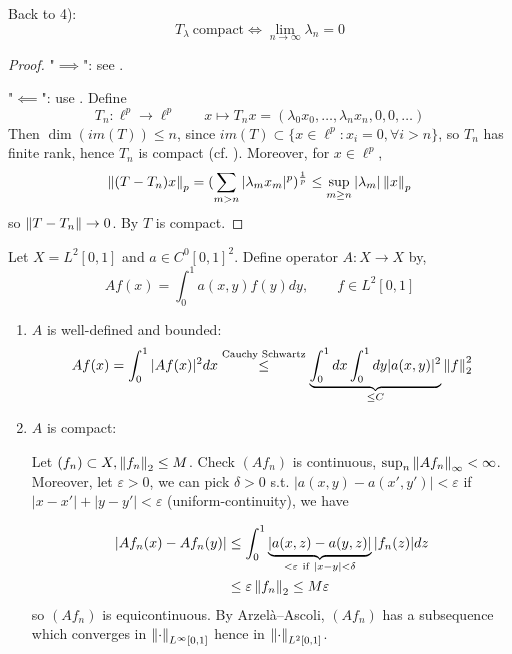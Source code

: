 \documentclass{article}
\begin{document}
\begin{example}
    Back to  4):  
$$
T_\lambda \ \text{compact} \iff \lim_{n\to \infty}\lambda_n=0
$$  
\end{example}

\begin{proof}
    "$\implies$": see .  

    "$\impliedby$": use . Define  
    $$
    T_n: \ell^p \to \ell^p \qquad x \mapsto T_nx=(\lambda_0x_0,\ldots,\lambda_nx_n,0,0,\ldots)
    $$  
    Then $\dim(im(T))\leq n$, since $im(T)\subset \{x\in \ell^p: x_i=0, \forall i>n\}$, so $T_n$ has finite rank, hence $T_n$ is compact (cf. ).  
    Moreover, for $x\in \ell^p$,  
    $$
    \left\|{(T-T_n)x}\right\|_p = (\sum_{m>n} |\lambda_mx_m|^p)^{\frac{1}{p}} \leq \sup_{m\geq n} |\lambda_m| \left\|{x}\right\|_p
    $$  
    so $\left\|{T-T_n}\right\|\to 0$. By  $T$ is compact.
\end{proof}

\begin{example}\nl
Let $X = L^2[0,1]$ and $a \in C^0[0,1]^2$. Define operator $A:X \to X$ by,  
$$
Af(x) = \int_0^1 a(x,y) f(y)dy, \qquad f\in L^2[0,1]
$$
\begin{enumerate}[1)]
    \item $A$ is well-defined and bounded:  
$$
Af(x) = \int_0^1 |Af(x)|^2 dx \overset{\text{Cauchy\ Schwartz}}{\leq} \underbrace{\int_0^1 dx \int_0^1 dy |a(x,y)|^2}_{\leq C} \left\|{f}\right\|_2^2
$$
\item $A$ is compact:   

Let $(f_n) \subset X, \left\|{f_n}\right\|_2 \leq M$. Check $(Af_n)$ is continuous, $\sup_n \left\|{Af_n}\right\|_{\infty} < \infty$. 
Moreover, let $\varepsilon>0$, we can pick $\delta>0$ s.t. $|a(x,y)-a(x',y')|<\varepsilon$ if $|x-x'|+|y-y'|<\varepsilon$ (uniform-continuity), we have  

\begin{align*}
    |Af_n(x) - Af_n(y)| &\leq \int_0^1 \underbrace{|a(x,z)-a(y,z)|}_{<\varepsilon \ \text{if}\ |x-y|<\delta} |f_n(z)| dz \\
    & \leq \varepsilon \norm{f_n}_2 \leq M\varepsilon
\end{align*}  
so $(Af_n)$ is equicontinuous. By Arzelà–Ascoli, $(Af_n)$ has a subsequence which converges in $\left\|{\cdot}\right\|_{L^{\infty}[0,1]}$ hence in $\left\|{\cdot}\right\|_{L^{2}[0,1]}$.
\end{enumerate}


\end{example}
\end{document}
